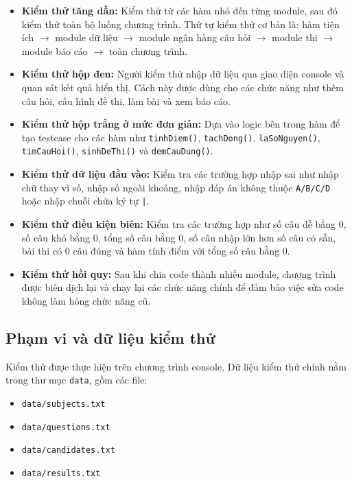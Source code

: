 \documentclass[12pt,a4paper]{report}
\begin{document}
\begin{itemize}
    \item \textbf{Kiểm thử tăng dần:} Kiểm thử từ các hàm nhỏ đến từng module, sau đó kiểm thử toàn bộ luồng chương trình. Thứ tự kiểm thử cơ bản là: hàm tiện ích $\rightarrow$ module dữ liệu $\rightarrow$ module ngân hàng câu hỏi $\rightarrow$ module thi $\rightarrow$ module báo cáo $\rightarrow$ toàn chương trình.
    \item \textbf{Kiểm thử hộp đen:} Người kiểm thử nhập dữ liệu qua giao diện console và quan sát kết quả hiển thị. Cách này được dùng cho các chức năng như thêm câu hỏi, cấu hình đề thi, làm bài và xem báo cáo.
    \item \textbf{Kiểm thử hộp trắng ở mức đơn giản:} Dựa vào logic bên trong hàm để tạo testcase cho các hàm như \texttt{tinhDiem()}, \texttt{tachDong()}, \texttt{laSoNguyen()}, \texttt{timCauHoi()}, \texttt{sinhDeThi()} và \texttt{demCauDung()}.
    \item \textbf{Kiểm thử dữ liệu đầu vào:} Kiểm tra các trường hợp nhập sai như nhập chữ thay vì số, nhập số ngoài khoảng, nhập đáp án không thuộc \texttt{A/B/C/D} hoặc nhập chuỗi chứa ký tự \texttt{|}.
    \item \textbf{Kiểm thử điều kiện biên:} Kiểm tra các trường hợp như số câu dễ bằng 0, số câu khó bằng 0, tổng số câu bằng 0, số câu nhập lớn hơn số câu có sẵn, bài thi có 0 câu đúng và hàm tính điểm với tổng số câu bằng 0.
    \item \textbf{Kiểm thử hồi quy:} Sau khi chia code thành nhiều module, chương trình được biên dịch lại và chạy lại các chức năng chính để đảm bảo việc sửa code không làm hỏng chức năng cũ.
\end{itemize}

\subsection{Phạm vi và dữ liệu kiểm thử}

Kiểm thử được thực hiện trên chương trình console. Dữ liệu kiểm thử chính nằm trong thư mục \texttt{data}, gồm các file:

\begin{itemize}
    \item \texttt{data/subjects.txt}
    \item \texttt{data/questions.txt}
    \item \texttt{data/candidates.txt}
    \item \texttt{data/results.txt}
\end{itemize}
\end{document}
